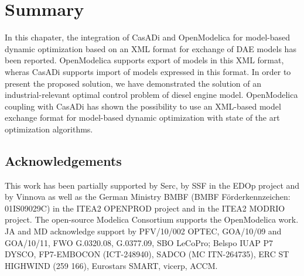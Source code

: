 \section{Summary}
\label{sec:optimizationsummary}

In this chapater, the integration of CasADi and OpenModelica for model-based dynamic optimization based on an XML format for exchange of DAE models has been reported.  OpenModelica supports export of models in this XML format, wheras CasADi supports import of models expressed in this format. In order to present the proposed solution, we have demonstrated the solution of an industrial-relevant optimal control problem of diesel engine model. OpenModelica coupling with CasADi has shown the possibility to use an XML-based model exchange format for model-based dynamic optimization with state of the art optimization algorithms.  

\subsection*{Acknowledgements}
\label{sec:optimizationacknowledgements}

This work has been partially supported by Serc, by SSF in the EDOp project and by Vinnova as well as the German
Ministry BMBF (BMBF F\"{o}rderkennzeichen: 01IS09029C) in the ITEA2 OPENPROD project and in the ITEA2 MODRIO
project. The open-source Modelica Consortium supports the OpenModelica work.
JA and MD acknowledge support by PFV/10/002 OPTEC, GOA/10/09 and GOA/10/11, FWO G.0320.08, G.0377.09,
SBO LeCoPro; Belspo IUAP P7 DYSCO, FP7-EMBOCON (ICT-248940), SADCO (MC ITN-264735),
ERC ST HIGHWIND (259 166), Eurostars SMART, vicerp, ACCM.





